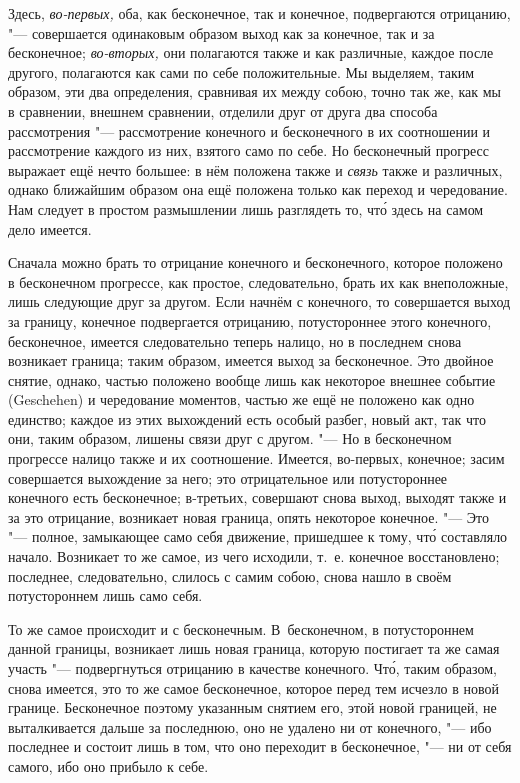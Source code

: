 Здесь, {\em во-первых,} оба, как бесконечное, так и
конечное, подвергаются отрицанию, "--- совершается одинаковым образом выход
как за конечное, так и за бесконечное; {\em во-вторых,}
они полагаются также и как различные, каждое после другого, полагаются как
сами по себе положительные. Мы выделяем, таким образом, эти два
определения, сравнивая их между собою, точно так же, как мы в сравнении,
внешнем сравнении, отделили друг от друга два способа рассмотрения
"--- рассмотрение конечного и бесконечного в их соотношении и рассмотрение
каждого из них, взятого само по себе. Но бесконечный прогресс выражает ещё
нечто большее: в нём положена также и {\em связь} также
и различных, однако ближайшим образом она ещё положена только как переход и
чередование. Нам следует в простом размышлении лишь разглядеть то, чт\'{о}
здесь на самом дело имеется.

Сначала можно брать то отрицание конечного и бесконечного, которое положено
в бесконечном прогрессе, как простое, следовательно, брать их как
внеположные, лишь следующие друг за другом. Если начнём с конечного, то
совершается выход за границу, конечное подвергается отрицанию,
потустороннее этого конечного, бесконечное, имеется следовательно теперь
налицо, но в последнем снова возникает граница; таким образом, имеется
выход за бесконечное. Это двойное снятие, однако, частью положено вообще
лишь как некоторое внешнее событие (Geschehen) и чередование моментов,
частью же ещё не положено как одно единство; каждое из этих выхождений есть
особый разбег, новый акт, так что они, таким образом, лишены связи друг с
другом. "--- Но в бесконечном прогрессе налицо также и их соотношение.
Имеется, во-первых, конечное; засим совершается выхождение за него; это
отрицательное или потустороннее конечного есть бесконечное; в-третьих,
совершают снова выход, выходят также и за это отрицание, возникает новая
граница, опять некоторое конечное. "--- Это "--- полное, замыкающее само себя
движение, пришедшее к тому, чт\'{о} составляло начало. Возникает то же самое,
из чего исходили, т.~е. конечное восстановлено; последнее, следовательно,
слилось с самим собою, снова нашло в своём потустороннем лишь само себя.

То же самое происходит и с бесконечным. В~бесконечном, в потустороннем
данной границы, возникает лишь новая граница, которую постигает та же самая
участь "--- подвергнуться отрицанию в качестве конечного. Чт\'{о}, таким образом,
снова имеется, это то же самое бесконечное, которое перед тем исчезло в
новой границе. Бесконечное поэтому указанным снятием его, этой новой
границей, не выталкивается дальше за последнюю, оно не удалено ни от
конечного, "--- ибо последнее и состоит лишь в том, что оно переходит в
бесконечное, "--- ни от себя самого, ибо оно прибыло к себе.

